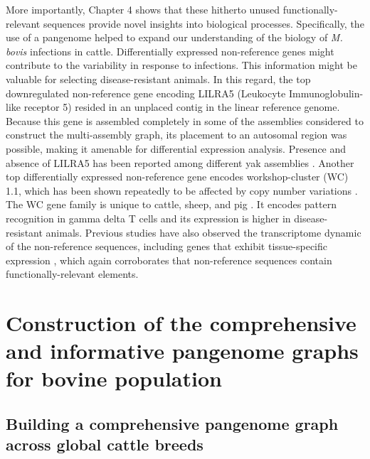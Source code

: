 \documentclass[../main.tex]{subfiles}
\begin{document}
More importantly, Chapter 4 shows that these hitherto unused functionally-relevant sequences provide novel insights into biological processes. Specifically, the use of a pangenome helped to expand our understanding of the biology of \emph{M. bovis} infections in cattle. Differentially expressed non-reference genes might contribute to the variability in response to infections. This information might be valuable for selecting disease-resistant animals. In this regard, the top downregulated non-reference gene encoding LILRA5 (Leukocyte Immunoglobulin-like receptor 5) resided in an unplaced contig in the linear reference genome. Because this gene is assembled completely in some of the assemblies considered to construct the multi-assembly graph, its placement to an autosomal region was possible, making it amenable for differential expression analysis. Presence and absence of LILRA5 has been reported among different yak assemblies \citep{ji2021chromosome}. Another top differentially expressed non-reference gene encodes workshop-cluster (WC) 1.1, which has been shown repeatedly to be affected by copy number variations \citep{liu2010analysis,chen2012gene,bickhart2012copy,Low2020}. The WC gene family is unique to cattle, sheep, and pig \citep{bickhart2014challenges}. It  encodes pattern recognition in gamma delta T cells and its expression is higher in disease-resistant animals. Previous studies have also observed the transcriptome dynamic of the non-reference sequences, including genes that exhibit tissue-specific expression \citep{wong2018novo,wong2020towards,li2019towards}, which again corroborates that non-reference sequences contain functionally-relevant elements. 

\section{Construction of the comprehensive and informative pangenome graphs for bovine population}

\subsection*{Building a comprehensive pangenome graph across global cattle breeds}
\end{document}
